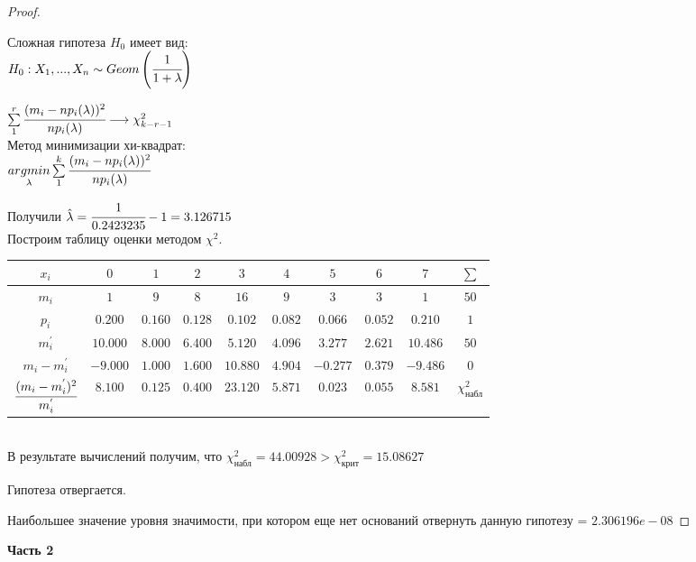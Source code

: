 \begin{proof}
	$ $
	
	Сложная гипотеза $H_0$ имеет вид: \\
	
	$H_0: X_1, ..., X_n \sim Geom\left(\cfrac{1}{1+\lambda}\right)$ 
	
	$\sum\limits_1^r\cfrac{(m_i-np_i(\lambda))^2}{np_i(\lambda)}\longrightarrow\chi^2_{k-r-1}$ \\
	
	Метод минимизации хи-квадрат: \\
	
	$\underset{\lambda}{argmin}\sum\limits_1^k\cfrac{(m_i-np_i(\lambda))^2}{np_i(\lambda)}$

	Получили $\hat{\lambda}=\cfrac1{0.2423235}-1=3.126715$ \\
	
	Построим таблицу оценки методом $\chi^2$. \\

	\begin{tabular}{|c|c|c|c|c|c|c|c|c|c|}
		\hline
		$x_i$ & $0$ & $1$ & $2$ & $3$ & $4$ & $5$ & $6$ & $7$ & $\sum$ \\ \hline 
		$m_i$ & $1$ & $9$ & $8$ & $16$ & $9$ & $3$ & $3$ & $1$ & $50$ \\ \hline 
		$p_i$ & $0.200$ & $0.160$ & $0.128$ & $0.102$ & $0.082$ & $0.066$ & $0.052$ & $0.210$ & $1$ \\ \hline 
		$m_i^{'}$ & $10.000$ & $8.000$ & $6.400$ & $5.120$ & $4.096$ & $3.277$ & $2.621$ & $10.486$ & $50$ \\ \hline 
		$m_i-m_i^{'}$ & $-9.000$ & $1.000$ & $1.600$ & $10.880$ & $4.904$ & $-0.277$ & $0.379$ & $-9.486$ & $0$ \\ \hline 
		$\cfrac{(m_i-m_i^{'})^2}{m_i^{'}}$ & $8.100$ & $0.125$ & $0.400$ & $23.120$ & $5.871$ & $0.023$ & $0.055$ & $8.581$ & $\chi^2_{\text{набл}}$ \\
		\hline
	\end{tabular} \\

	В результате вычислений получим, что $\chi^2_{\text{набл}}=44.00928>\chi^2_{\text{крит}}=15.08627$ 
	 
	Гипотеза отвергается. 
	
	Наибольшее значение уровня значимости, при котором еще нет оснований отвернуть данную гипотезу = $2.306196e-08$	
\end{proof}

\newpage

\textbf{Часть 2}

